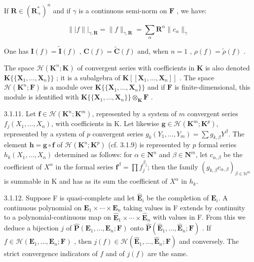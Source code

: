 If \(\mathbf{R} \in (\mathbf{R}_{+}^{*})^{n}\) and if \(\gamma\) is a continuous semi-norm on \(\mathbf{F}\) , we have:

\[
\| | f \| | _ {\gamma , \mathbf {R}} = \| f \| _ {\gamma , \mathbf {R}} = \sum_ {\alpha} \mathbf {R} ^ {\alpha} \| c _ {\alpha} \| _ {\gamma}
\]

One has \(\mathbf{I}(f) = \tilde{\mathbf{I}}(f)\) , \(\mathbf{C}(f) = \tilde{\mathbf{C}}(f)\) and, when \(n = 1\) , \(\rho(f) = \tilde{\rho}(f)\) .

The space \(\mathcal{H}(\mathbf{K}^{n};\mathbf{K})\) of convergent series with coefficients in \(\mathbf{K}\) is also denoted \(\mathbf{K}\{\{\mathbf{X}_{1},\ldots ,\mathbf{X}_{n}\}\}\) ; it is a subalgebra of \(\mathbf{K}[[\mathbf{X}_1,\dots ,\mathbf{X}_n]]\) . The space \(\mathcal{H}(\mathbf{K}^n;\mathbf{F})\) is a module over \(\mathbf{K}\{\{\mathbf{X}_1,\ldots ,\mathbf{X}_n\}\}\) and if \(\mathbf{F}\) is finite-dimensional, this module is identified with \(\mathbf{K}\{\{\mathbf{X}_1,\ldots ,\mathbf{X}_n\}\} \otimes_{\mathbf{K}}\mathbf{F}\) .

3.1.11. Let \(\mathbf{f} \in \mathcal{H}(\mathbf{K}^n; \mathbf{K}^m)\), represented by a system of \(m\) convergent series \(f_j(X_1, \ldots, X_n)\), with coefficients in K. Let likewise \(\mathbf{g} \in \mathcal{H}(\mathbf{K}^m; \mathbf{K}^p)\), represented by a system of \(p\) convergent series \(g_k(Y_1, \ldots, Y_m) = \sum g_{k,\beta} Y^\beta\). The element \(\mathbf{h} = \mathbf{g} \circ \mathbf{f}\) of \(\mathcal{H}(\mathbf{K}^n; \mathbf{K}^p)\) (cf. 3.1.9) is represented by \(p\) formal series \(h_k(X_1, \ldots, X_n)\) determined as follows: for \(\alpha \in \mathbf{N}^n\) and \(\beta \in \mathbf{N}^m\), let \(c_{\alpha,\beta}\) be the coefficient of \(X^\alpha\) in the formal series \(\mathbf{f}^\beta = \prod f_j^{\beta_j}\); then the family \((g_{k,\beta} c_{\alpha,\beta})_{\beta \in \mathbb{N}^m}\) is summable in K and has as its sum the coefficient of \(X^\alpha\) in \(h_k\).

3.1.12. Suppose F is quasi-complete and let \(\hat{\mathbf{E}}_{i}\) be the completion of \(\mathbf{E}_{i}\). A continuous polynomial on \(\mathbf{E}_{1} \times \cdots \times \mathbf{E}_{n}\) taking values in F extends by continuity to a polynomial-continuous map on \(\hat{\mathbf{E}}_{1} \times \cdots \times \hat{\mathbf{E}}_{n}\) with values in F. From this we deduce a bijection \(j\) of \(\hat{\mathbf{P}}(\mathbf{E}_{1}, \ldots, \mathbf{E}_{n}; \mathbf{F})\) onto \(\hat{\mathbf{P}}(\hat{\mathbf{E}}_{1}, \ldots, \hat{\mathbf{E}}_{n}; \mathbf{F})\) . If \(f \in \mathcal{H}(\mathbf{E}_{1}, \ldots, \mathbf{E}_{n}; \mathbf{F})\) , then \(j(f) \in \mathcal{H}(\hat{\mathbf{E}}_{1}, \ldots, \hat{\mathbf{E}}_{n}; \mathbf{F})\) and conversely. The strict convergence indicators of \(f\) and of \(j(f)\) are the same.


